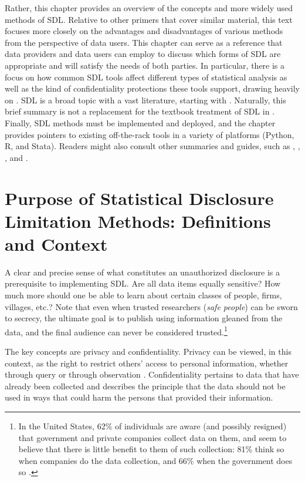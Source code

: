 Rather, this chapter provides an overview of the concepts and more widely used methods of SDL. Relative to other primers that cover similar material, this text focuses more closely on the advantages and disadvantages of various methods from the perspective of data users. This chapter can serve as a reference that data providers and data users can employ to discuss which forms of SDL are appropriate and will satisfy the needs of both parties. In particular, there is a focus on how common SDL tools affect different types of statistical analysis as well as the kind of confidentiality protections these tools support, drawing heavily on \citet{abowd_economic_2015}. SDL is a broad topic with a vast literature, starting with \citet{fellegi_question_1972}. Naturally, this brief summary is not a replacement for the textbook treatment of SDL in \citet{duncan_statistical_2011}. Finally, SDL methods must be implemented and deployed, and the chapter provides pointers to existing off-the-rack tools in a variety of platforms (Python, R, and Stata). Readers might also consult other summaries and guides, such as \citet{dupriez_dissemination_2010}, \citet{world_bank_dime_nodate}, \citet{kopper_j-pal_2020}, and \citet{liu_statistical_2020}.

\hypertarget{purpose-of-statistical-disclosure-limitation-methods-definitions-and-context}{%
\section{Purpose of Statistical Disclosure Limitation Methods: Definitions and Context}\label{purpose-of-statistical-disclosure-limitation-methods-definitions-and-context}}

A clear and precise sense of what constitutes an unauthorized disclosure is a prerequisite to implementing SDL. Are all data items equally sensitive? How much more should one be able to learn about certain classes of people, firms, villages, etc.? Note that even when trusted researchers (\emph{safe people}) can be sworn to secrecy, the ultimate goal is to publish using information gleaned from the data, and the final audience can never be considered trusted.\footnote{In the United States, 62\% of individuals are aware (and possibly resigned) that government and private companies collect data on them, and seem to believe that there is little benefit to them of such collection: 81\% think so when companies do the data collection, and 66\% when the government does so \citep{auxier_americans_2019}.}

The key concepts are privacy and confidentiality. Privacy can be viewed, in this context, as the right to restrict others' access to personal information, whether through query or through observation \citep{hirshleifer_privacy_1980}. Confidentiality pertains to data that have already been collected and describes the principle that the data should not be used in ways that could harm the persons that provided their information.


